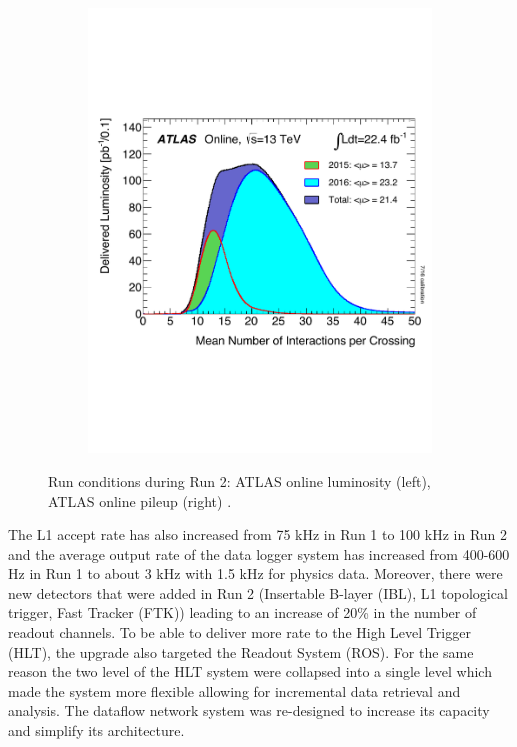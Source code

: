 \begin{figure}[t!]
\begin{subfigure}[t]{0.48\textwidth}
\includegraphics[width=\textwidth]{mu_2015_2016_ICHEP}
\end{subfigure}
\vspace{-2cm}
\caption{Run conditions during Run 2: ATLAS online luminosity (left), ATLAS online pileup (right) \cite{atlasTwiki}.}
\label{fig:lumi_pileup_1}
\end{figure} 
The L1 accept 
rate has also increased from 75 kHz in Run 1 to 100 kHz in Run 2 and the average output rate of the data logger system has 
increased from 400-600 Hz in Run 1 to about 3 kHz with 1.5 kHz for physics data. 
Moreover, there were new detectors that were added in Run 2
(Insertable B-layer (IBL), L1 topological trigger, Fast Tracker (FTK))\cite{Aad:1602235} leading to 
an increase of 20\% in the number of readout channels. 
To be able to deliver more rate to the High Level Trigger (HLT), the upgrade also targeted the Readout System (ROS)\cite{PanduroVazquez2016939}. 
For the same reason the two level of the HLT system were collapsed into a single level which made the system more flexible 
 allowing for incremental data retrieval and analysis. 
The dataflow network system was re-designed to increase its capacity and simplify its architecture\cite{1742-6596-396-1-012033}.

